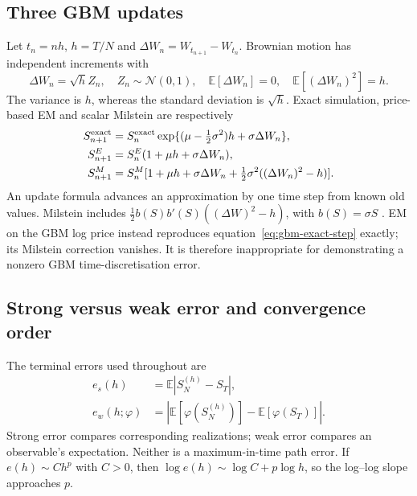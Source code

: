 \documentclass[11pt,a4paper]{article}
\begin{document}
\subsection{Three GBM updates}
Let $t_n=nh$, $h=T/N$ and $\Delta W_n=W_{t_{n+1}}-W_{t_n}$. Brownian motion has independent increments with
\begin{equation}\label{eq:increment}
\Delta W_n=\sqrt h Z_n,\quad Z_n\sim\mathcal N(0,1),\quad
\mathbb E[\Delta W_n]=0,\quad \mathbb E[(\Delta W_n)^2]=h.
\end{equation}
The variance is $h$, whereas the standard deviation is $\sqrt h$. Exact simulation, price-based EM and scalar Milstein are respectively
\begin{align}
S_{n+1}^{\rm exact}&=S_n^{\rm exact}\exp\{(\mu-\tfrac12\sigma^2)h+\sigma\Delta W_n\},\label{eq:gbm-exact-step}\\
S_{n+1}^{E}&=S_n^E(1+\mu h+\sigma\Delta W_n),\label{eq:em}\\
S_{n+1}^{M}&=S_n^M[1+\mu h+\sigma\Delta W_n+
\tfrac12\sigma^2((\Delta W_n)^2-h)].\label{eq:mil}
\end{align}
An update formula advances an approximation by one time step from known old values. Milstein includes $\tfrac12 b(S)b'(S)((\Delta W)^2-h)$, with $b(S)=\sigma S$ \cite{higham,kloeden}. EM on the GBM log price instead reproduces equation~\eqref{eq:gbm-exact-step} exactly; its Milstein correction vanishes. It is therefore inappropriate for demonstrating a nonzero GBM time-discretisation error.

\subsection{Strong versus weak error and convergence order}\label{sec:orders}
The terminal errors used throughout are
\begin{align}
e_s(h)&=\mathbb E|S_N^{(h)}-S_T|,\label{eq:strong}\\
e_w(h;\varphi)&=|\mathbb E[\varphi(S_N^{(h)})]-\mathbb E[\varphi(S_T)]|.\label{eq:weak-definition}
\end{align}
Strong error compares corresponding realizations; weak error compares an observable's expectation. Neither is a maximum-in-time path error. If $e(h)\sim Ch^p$ with $C>0$, then $\log e(h)\sim\log C+p\log h$, so the log--log slope approaches $p$.
\end{document}
